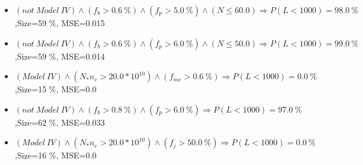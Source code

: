 \documentclass[numbered]{CSL}
\begin{document}
\begin{itemize}
\item $(not~Model~IV) \land (f_b > 0.6~\%) \land (f_p > 5.0~\%) \land (N \leq 60.0) \Rightarrow P(L < 1 000) = 98.0~\%$,\hfill Size=59 \%, MSE=0.015
\item $(not~Model~IV) \land (f_b > 0.6~\%) \land (f_p > 6.0~\%) \land (N \leq 50.0) \Rightarrow P(L < 1 000) = 99.0~\%$,\hfill Size=59 \%, MSE=0.014
\item $(Model~IV) \land (N_* n_e > 20.0 * 10^{10}) \land (f_{me} > 0.6~\%) \Rightarrow P(L < 1 000) = 0.0~\%$,\hfill Size=15 \%, MSE=0.0
\item $(not~Model~IV) \land (f_b > 0.8~\%) \land (f_p > 6.0~\%) \Rightarrow P(L < 1 000) = 97.0~\%$,\hfill Size=62 \%, MSE=0.033
\item $(Model~IV) \land (N_* n_e > 20.0 * 10^{10}) \land (f_j > 50.0~\%) \Rightarrow P(L < 1 000) = 0.0~\%$,\hfill Size=16 \%, MSE=0.0
\end{itemize}
\end{document}
